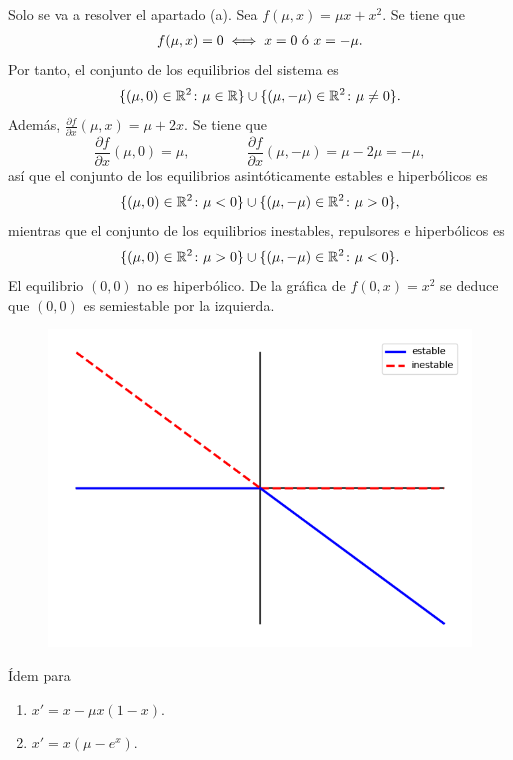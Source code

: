 \documentclass[11pt]{report}
\begin{document}
\begin{solution}
    Solo se va a resolver el apartado (a). Sea $f(\mu,x) = \mu x + x^2$. Se tiene que
    \begin{align*}
        f(\mu,x) = 0 \iff x = 0 \textup{ ó } x = -\mu.
    \end{align*}
    Por tanto, el conjunto de los equilibrios del sistema es
    \[\{(\mu,0) \in\mathbb R^2 \colon \mu \in \mathbb R\} \cup \{(\mu,-\mu) \in\mathbb R^2 \colon \mu \neq 0\}.\]
    Además, $\frac{\partial f}{\partial x}(\mu,x) = \mu+2x$. Se tiene que \[\frac{\partial f}{\partial x}(\mu,0) = \mu, \qquad \qquad \frac{\partial f}{\partial x}(\mu,-\mu) = \mu-2\mu = -\mu,\] así que el conjunto de los equilibrios asintóticamente estables e hiperbólicos es
    \[\{(\mu,0) \in\mathbb R^2 \colon \mu < 0\} \cup \{(\mu,-\mu) \in\mathbb R^2 \colon \mu > 0\},\]
    mientras que el conjunto de los equilibrios inestables, repulsores e hiperbólicos es
    \[\{(\mu,0) \in\mathbb R^2 \colon \mu > 0 \} \cup \{(\mu,-\mu) \in\mathbb R^2 \colon \mu < 0\}.\]
    El equilibrio $(0,0)$ no es hiperbólico. De la gráfica de $f(0,x) = x^2$ se deduce que $(0,0)$ es semiestable por la izquierda.
    \begin{figure}[H]
        \centering
        \includegraphics[scale=0.5]{img/7.png}
    \end{figure}
\end{solution}

\begin{exercise}
    Ídem para
    \begin{enumerate}
        \item $x' = x-\mu x(1-x)$.
        \item $x' = x(\mu-e^x)$.
    \end{enumerate}
\end{exercise}
\end{document}
